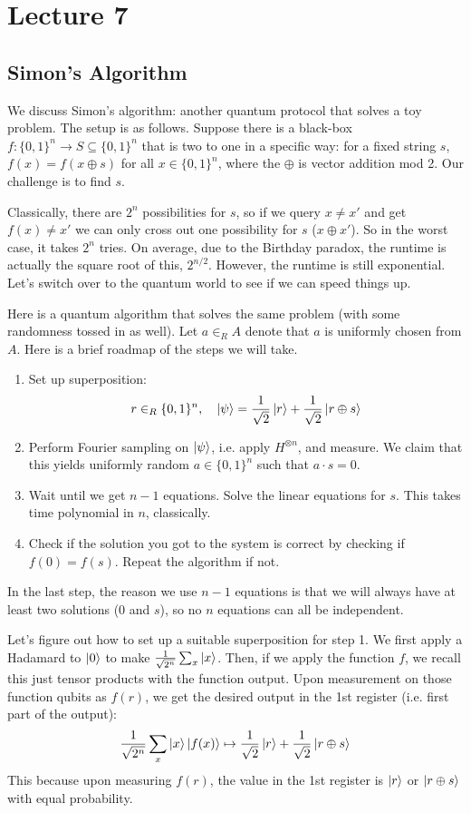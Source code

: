 
\section{Lecture 7}

\subsection{Simon's Algorithm}
We discuss Simon's algorithm: another quantum protocol that solves a toy problem. The setup is as follows.
Suppose there is a black-box $f: \{0, 1\}^n \to S \subseteq \{0, 1\}^n$ that is two to one in a specific way: for a fixed string $s$, $f(x) = f(x \oplus s)$ for all $x \in \{0, 1\}^n$,
where the $\oplus$ is vector addition mod 2. Our challenge is to find $s$.

Classically, there are $2^n$ possibilities for $s$, so if we query $x \neq x'$ and get $f(x) \neq x'$ we can only
cross out one possibility for $s$ ($x \oplus x'$). So in the worst case, it takes $2^n$ tries. On average, due to the Birthday paradox,
the runtime is actually the square root of this, $2^{n/2}$. However, the runtime is still exponential. Let's switch over to the quantum world to see if we can speed things up.

Here is a quantum algorithm that solves the same problem (with some randomness tossed in as well). Let $a \in_R A$ denote that $a$ is uniformly chosen
from $A$. Here is a brief roadmap of the steps we will take.
\begin{enumerate}
    \item Set up superposition:
    \[ r \in_R \{0, 1\}^n, \quad \ket{\psi} = \frac{1}{\sqrt{2}} \ket{r} + \frac{1}{\sqrt{2}} \ket{r \oplus s} \]
    \item Perform Fourier sampling on $\ket{\psi}$, i.e. apply $H^{\otimes n}$, and measure. We claim that this yields uniformly random $a \in \{0, 1\}^n$ such that $a \cdot s = 0$.
    \item Wait until we get $n - 1$ equations. Solve the linear equations for $s$. This takes time polynomial in $n$, classically.
    \item Check if the solution you got to the system is correct by checking if $f(0) = f(s)$. Repeat the algorithm if not.
\end{enumerate}
In the last step, the reason we use $n - 1$ equations is that we will always have at least two solutions ($0$ and $s$), so no $n$ equations can all be independent.

Let's figure out how to set up a suitable superposition for step 1. We first apply a Hadamard to $\ket{0}$
to make $\frac{1}{\sqrt{2^n}}\sum_x \ket{x}$. Then, if we apply the function $f$, we recall this just tensor products with the function output. Upon measurement on those function qubits
as $f(r)$, we get the desired output in the 1st register (i.e. first part of the output):
\[ \frac{1}{\sqrt{2^n}} \sum_x \ket{x} \ket{f(x)} \mapsto \frac{1}{\sqrt{2}} \ket{r} + \frac{1}{\sqrt{2}} \ket{r \oplus s}  \]
This because upon measuring $f(r)$, the value in the 1st register is $\ket{r}$ or $\ket{r \oplus s}$ with equal probability.

